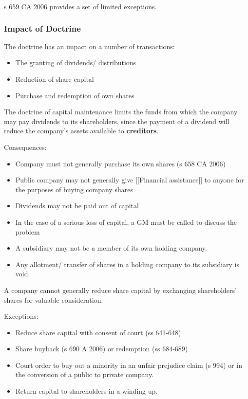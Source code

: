 \documentclass[
]{article}
\providecommand{\tightlist}{%
  \setlength{\itemsep}{0pt}\setlength{\parskip}{0pt}}
\begin{document}
\href{https://www.legislation.gov.uk/ukpga/2006/46/section/659}{s 659 CA
2006} provides a set of limited exceptions.

\hypertarget{impact-of-doctrine}{%
\subsubsection{Impact of Doctrine}\label{impact-of-doctrine}}

The doctrine has an impact on a number of transactions:

\begin{itemize}
\tightlist
\item
  The granting of dividends/ distributions
\item
  Reduction of share capital
\item
  Purchase and redemption of own shares
\end{itemize}

The doctrine of capital maintenance limits the funds from which the
company may pay dividends to its shareholders, since the payment of a
dividend will reduce the company's assets available to
\textbf{creditors}.

Consequences:

\begin{itemize}
\tightlist
\item
  Company must not generally purchase its own shares (s 658 CA 2006)
\item
  Public company may not generally give {[}{[}Financial assistance{]}{]}
  to anyone for the purposes of buying company shares
\item
  Dividends may not be paid out of capital
\item
  In the case of a serious loss of capital, a GM must be called to
  discuss the problem
\item
  A subsidiary may not be a member of its own holding company.
\item
  Any allotment/ transfer of shares in a holding company to its
  subsidiary is void.
\end{itemize}

A company cannot generally reduce share capital by exchanging
shareholders' shares for valuable consideration.

Exceptions:

\begin{itemize}
\tightlist
\item
  Reduce share capital with consent of court (ss 641-648)
\item
  Share buyback (s 690 A 2006) or redemption (ss 684-689)
\item
  Court order to buy out a minority in an unfair prejudice claim (s 994)
  or in the conversion of a public to private company.
\item
  Return capital to shareholders in a winding up.
\end{itemize}
\end{document}
